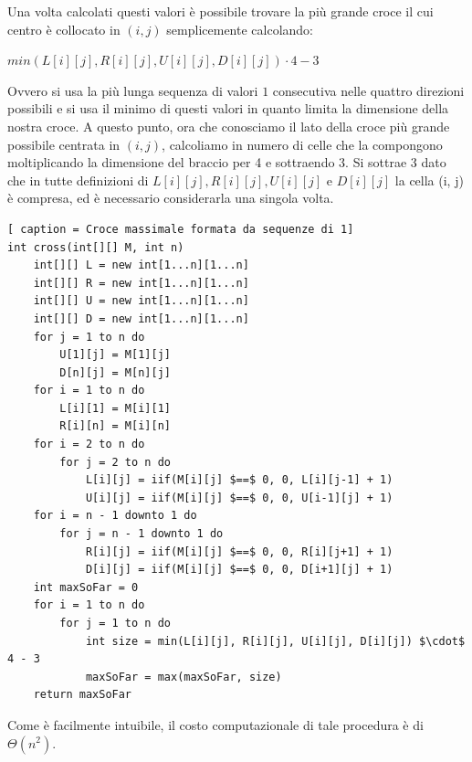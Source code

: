 \documentclass[../cheatSheetAlgoritmi.tex]{subfiles}
\begin{document}
Una volta calcolati questi valori è possibile trovare la più grande croce il cui centro è collocato in $(i, j)$ semplicemente calcolando: 
\begin{center}
$min(L[i][j], R[i][j], U[i][j], D[i][j]) \cdot 4 - 3$
\end{center}
Ovvero si usa la più lunga sequenza di valori $1$ consecutiva nelle quattro direzioni possibili e si usa il minimo di questi valori in quanto limita la dimensione della nostra croce. A questo punto, ora che conosciamo il lato della croce più grande possibile centrata in $(i, j)$, calcoliamo in numero di celle che la compongono moltiplicando la dimensione del braccio per 4 e sottraendo 3. Si sottrae 3 dato che in tutte definizioni di $L[i][j], R[i][j], U[i][j]$ e $D[i][j]$ la cella (i, j) è compresa, ed è necessario considerarla una singola volta.
\begin{lstlisting}[ caption = Croce massimale formata da sequenze di 1]
int cross(int[][] M, int n)
	int[][] L = new int[1...n][1...n]
	int[][] R = new int[1...n][1...n]
	int[][] U = new int[1...n][1...n]
	int[][] D = new int[1...n][1...n]
	for j = 1 to n do
		U[1][j] = M[1][j]
		D[n][j] = M[n][j]
	for i = 1 to n do
		L[i][1] = M[i][1]
		R[i][n] = M[i][n]
	for i = 2 to n do
		for j = 2 to n do
			L[i][j] = iif(M[i][j] $==$ 0, 0, L[i][j-1] + 1)
			U[i][j] = iif(M[i][j] $==$ 0, 0, U[i-1][j] + 1)
	for i = n - 1 downto 1 do
		for j = n - 1 downto 1 do
			R[i][j] = iif(M[i][j] $==$ 0, 0, R[i][j+1] + 1)
			D[i][j] = iif(M[i][j] $==$ 0, 0, D[i+1][j] + 1)
	int maxSoFar = 0
	for i = 1 to n do
		for j = 1 to n do
			int size = min(L[i][j], R[i][j], U[i][j], D[i][j]) $\cdot$ 4 - 3
			maxSoFar = max(maxSoFar, size)
	return maxSoFar
\end{lstlisting}
Come è facilmente intuibile, il costo computazionale di tale procedura è di $\Theta(n^2)$.
 
\end{document}
